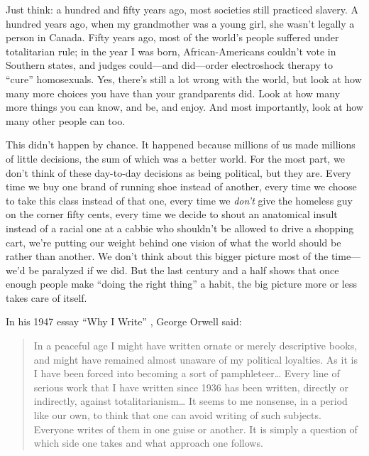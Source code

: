 \documentclass{report}
\begin{document}
Just think: a hundred and fifty years ago, most societies still
practiced slavery.  A hundred years ago, when my grandmother was a
young girl, she wasn't legally a person in Canada.  Fifty years ago,
most of the world's people suffered under totalitarian rule; in the
year I was born, African-Americans couldn't vote in Southern states,
and judges could---and did---order electroshock therapy to ``cure''
homosexuals. Yes, there's still a lot wrong with the world, but look
at how many more choices you have than your grandparents did.  Look at
how many more things you can know, and be, and enjoy.  And most
importantly, look at how many other people can too.

This didn't happen by chance.  It happened because millions of us made
millions of little decisions, the sum of which was a better world.
For the most part, we don't think of these day-to-day decisions as
being political, but they are.  Every time we buy one brand of running
shoe instead of another, every time we choose to take this class
instead of that one, every time we \emph{don't} give the homeless guy
on the corner fifty cents, every time we decide to shout an anatomical
insult instead of a racial one at a cabbie who shouldn't be allowed to
drive a shopping cart, we're putting our weight behind one vision of
what the world should be rather than another.  We don't think about
this bigger picture most of the time---we'd be paralyzed if we did.
But the last century and a half shows that once enough people make
``doing the right thing'' a habit, the big picture more or less takes
care of itself.

In his 1947 essay ``Why I Write'' \cite{b:orwell-why-i-write}, George
Orwell said:

\begin{quotation}

  In a peaceful age I might have written ornate or merely descriptive
  books, and might have remained almost unaware of my political
  loyalties.  As it is I have been forced into becoming a sort of
  pamphleteer{\ldots} Every line of serious work that I have written
  since 1936 has been written, directly or indirectly, against
  totalitarianism{\ldots} It seems to me nonsense, in a period like
  our own, to think that one can avoid writing of such subjects.
  Everyone writes of them in one guise or another. It is simply a
  question of which side one takes and what approach one follows.

\end{quotation}
\end{document}

